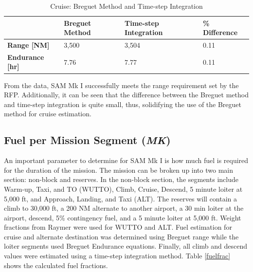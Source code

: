 \begin{table}[!h]
    \centering
    \caption{Cruise: Breguet Method and Time-step Integration}
    \begin{tabular}{|p{1in}||p{1in}|p{1.5in}|p{1in}|}\toprule 
     & \textbf{Breguet Method} & \textbf{Time-step Integration} & \textbf{\% Difference} \\ \hline \hline
    \textbf{Range [NM]} & 3,500 & 3,504 & 0.11 \\ \hline
    \textbf{Endurance [hr]} & 7.76 & 7.77 & 0.11 \\ 
    \bottomrule
    \end{tabular}
    \label{tab:cruise}
\end{table}

From the data, SAM Mk I successfully meets the range requirement set by the RFP. Additionally, it can be seen that the difference between the Breguet method and time-step integration is quite small, thus, solidifying the use of the Breguet method for cruise estimation. 

\subsection{Fuel per Mission Segment (\textit{MK})}
An important parameter to determine for SAM Mk I is how much fuel is required for the duration of the mission. The mission can be broken up into two main section: non-block and reserves. In the non-block section, the segments include Warm-up, Taxi, and TO (WUTTO), Climb, Cruise, Descend, 5 minute loiter at 5,000 ft, and Approach, Landing, and Taxi (ALT). The reserves will contain a climb to 30,000 ft, a 200 NM alternate to another airport, a 30 min loiter at the airport, descend, 5\% contingency fuel, and a 5 minute loiter at 5,000 ft. Weight fractions from Raymer\cite{raymer} were used for WUTTO and ALT. Fuel estimation for cruise and alternate destination was determined using Breguet range while the loiter segments used Breguet Endurance equations. Finally, all climb and descend values were estimated using a time-step integration method. Table \ref{fuelfrac} shows the calculated fuel fractions. 

